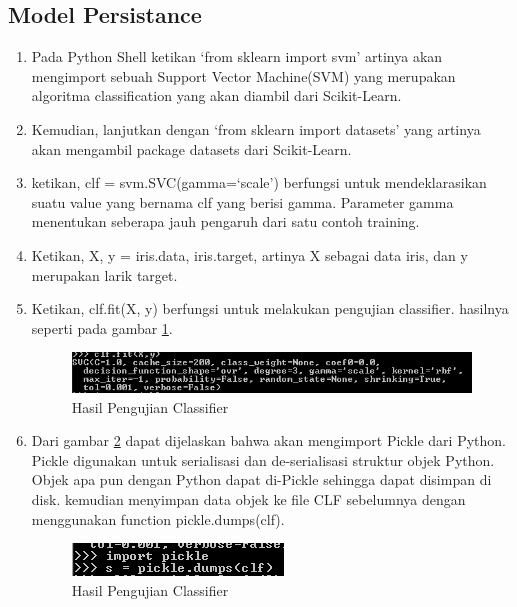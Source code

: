 \subsection{Model Persistance} 
\begin{enumerate}
\item Pada Python Shell ketikan `from sklearn import svm' artinya akan mengimport sebuah Support Vector Machine(SVM) yang merupakan algoritma classification yang akan diambil dari Scikit-Learn.
\item Kemudian, lanjutkan dengan `from sklearn import datasets' yang artinya akan mengambil package datasets dari Scikit-Learn.
\item ketikan, clf = svm.SVC(gamma=`scale') berfungsi untuk mendeklarasikan suatu value yang bernama clf yang berisi gamma. Parameter gamma menentukan seberapa jauh pengaruh dari satu contoh training.
\item Ketikan, X, y = iris.data, iris.target, artinya X sebagai data iris, dan y merupakan larik target.
\item Ketikan, clf.fit(X, y) berfungsi untuk melakukan pengujian classifier. hasilnya seperti pada gambar \ref{gambar6}.
\begin{figure}
	\begin{center}
   	 \includegraphics[scale=0.7]{figures/tasya7.png}
   	 \caption{Hasil Pengujian Classifier}
     \label{gambar6}	
	\end{center}
\end{figure}

\item Dari gambar \ref{gambar7} dapat dijelaskan bahwa akan mengimport Pickle dari Python. Pickle digunakan untuk serialisasi dan de-serialisasi struktur objek Python. Objek apa pun dengan Python dapat di-Pickle sehingga dapat disimpan di disk. kemudian menyimpan data objek ke file CLF sebelumnya dengan menggunakan function pickle.dumps(clf).
\begin{figure}
	\begin{center}
   	 \includegraphics[scale=1]{figures/tasya8.png}
   	 \caption{Hasil Pengujian Classifier}
     \label{gambar7}	
	\end{center}
\end{figure}


\end{enumerate}
